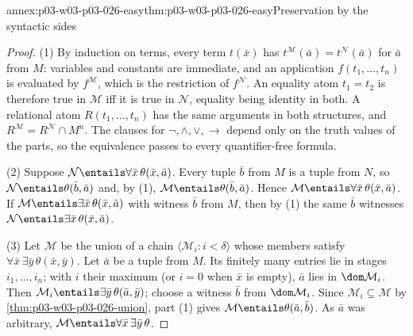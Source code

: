 \begin{annexitem}{annex:p03-w03-p03-026-easy}{thm:p03-w03-p03-026-easy}{Preservation by the syntactic sides}
\begin{proof}
(1) By induction on terms, every term \(t(\bar x)\) has
\(t^{\mathcal M}(\bar a)=t^{\mathcal N}(\bar a)\) for \(\bar a\) from \(M\):
variables and constants are immediate, and an application
\(f(t_1,\ldots,t_n)\) is evaluated by \(f^{\mathcal M}\), which is the
restriction of \(f^{\mathcal N}\).  An equality atom \(t_1=t_2\) is
therefore true in \(\mathcal M\) iff it is true in \(\mathcal N\), equality
being identity in both.  A relational atom \(R(t_1,\ldots,t_n)\) has the
same arguments in both structures, and
\(R^{\mathcal M}=R^{\mathcal N}\cap M^n\).  The clauses for
\(\neg,\land,\lor,\to\) depend only on the truth values of the parts, so the
equivalence passes to every quantifier-free formula.

(2) Suppose \(\mathcal N\entails\forall\bar x\,\theta(\bar x,\bar a)\).
Every tuple \(\bar b\) from \(M\) is a tuple from \(N\), so
\(\mathcal N\entails\theta(\bar b,\bar a)\) and, by (1),
\(\mathcal M\entails\theta(\bar b,\bar a)\).  Hence
\(\mathcal M\entails\forall\bar x\,\theta(\bar x,\bar a)\).  If
\(\mathcal M\entails\exists\bar x\,\theta(\bar x,\bar a)\) with witness
\(\bar b\) from \(M\), then by (1) the same \(\bar b\) witnesses
\(\mathcal N\entails\exists\bar x\,\theta(\bar x,\bar a)\).

(3) Let \(\mathcal M\) be the union of a chain
\(\langle\mathcal M_i:i<\delta\rangle\) whose members satisfy
\(\forall\bar x\,\exists\bar y\,\theta(\bar x,\bar y)\).  Let \(\bar a\) be
a tuple from \(M\).  Its finitely many entries lie in stages
\(i_1,\ldots,i_n\); with \(i\) their maximum (or \(i=0\) when \(\bar x\) is
empty), \(\bar a\) lies in \(\dom\mathcal M_i\).  Then
\(\mathcal M_i\entails\exists\bar y\,\theta(\bar a,\bar y)\); choose a
witness \(\bar b\) from \(\dom\mathcal M_i\).  Since
\(\mathcal M_i\subseteq\mathcal M\) by \cref{thm:p03-w03-p03-026-union},
part (1) gives \(\mathcal M\entails\theta(\bar a,\bar b)\).  As \(\bar a\) was
arbitrary, \(\mathcal M\entails\forall\bar x\,\exists\bar y\,\theta\).
\end{proof}
\end{annexitem}

